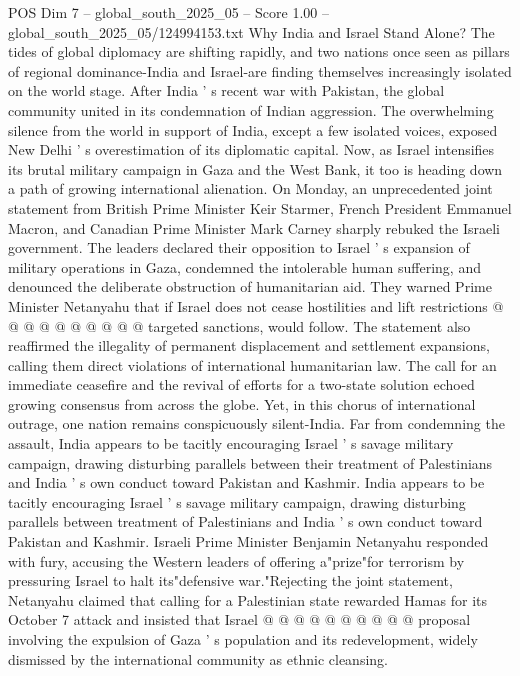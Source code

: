 \begin{textsample}{POS Dim 7 – global\_south\_2025\_05 – Score 1.00 – global\_south\_2025\_05/124994153.txt}  \label{ex:f7_pos_238}
Why India and Israel Stand Alone?
The tides of global diplomacy are shifting rapidly, and two nations once seen as pillars of regional dominance-India and Israel-are finding themselves increasingly isolated on the world stage.
After India ' s recent war with Pakistan, the global community united in its condemnation of Indian aggression.
The overwhelming silence from the world in support of India, except a few isolated voices, exposed New Delhi ' s overestimation of its diplomatic capital.
Now, as Israel intensifies its brutal military campaign in Gaza and the West Bank, it too is heading down a path of growing international alienation.
On Monday, an unprecedented joint statement from British Prime Minister Keir Starmer, French President Emmanuel Macron, and Canadian Prime Minister Mark Carney sharply rebuked the Israeli government.
The leaders declared their opposition to Israel ' s expansion of military operations in Gaza, condemned the intolerable human suffering, and denounced the deliberate obstruction of humanitarian aid.
They warned Prime Minister Netanyahu that if Israel does not cease hostilities and lift restrictions @ @ @ @ @ @ @ @ @ @ targeted sanctions, would follow.
The statement also reaffirmed the illegality of permanent displacement and settlement expansions, calling them direct violations of international humanitarian law.
The call for an immediate ceasefire and the revival of efforts for a two-state solution echoed growing consensus from across the globe.
Yet, in this chorus of international outrage, one nation remains conspicuously silent-India.
Far from condemning the assault, India appears to be tacitly encouraging Israel ' s savage military campaign, drawing disturbing parallels between their treatment of Palestinians and India ' s own conduct toward Pakistan and Kashmir.
India appears to be tacitly encouraging Israel ' s savage military campaign, drawing disturbing parallels between treatment of Palestinians and India ' s own conduct toward Pakistan and Kashmir.
Israeli Prime Minister Benjamin Netanyahu responded with fury, accusing the Western leaders of offering a"prize"for terrorism by pressuring Israel to halt its"defensive war."Rejecting the joint statement, Netanyahu claimed that calling for a Palestinian state rewarded Hamas for its October 7 attack and insisted that Israel @ @ @ @ @ @ @ @ @ @ proposal involving the expulsion of Gaza ' s population and its redevelopment, widely dismissed by the international community as ethnic cleansing.

\end{textsample}
